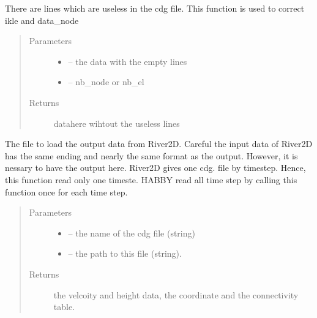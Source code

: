 \documentclass[letterpaper,10pt,english]{sphinxmanual}
\begin{document}
\begin{fulllineitems}
\label{\detokenize{index:src.river2d.get_rid_of_lines}}
There are lines which are useless in the cdg file. This function is used to correct ikle and data\_node
\begin{quote}\begin{description}
\item[{Parameters}] \leavevmode\begin{itemize}
\item {} 
 -- the data with the empty lines

\item {} 
 -- nb\_node or nb\_el

\end{itemize}

\item[{Returns}] \leavevmode
datahere wihtout the useless lines

\end{description}\end{quote}

\end{fulllineitems}


\begin{fulllineitems}
\label{\detokenize{index:src.river2d.load_river2d_cdg}}
The file to load the output data from River2D. Careful the input data of River2D has the same ending and nearly
the same format as the output. However, it is nessary to have the output here. River2D gives one cdg. file by timestep.
Hence, this function read only one timeste. HABBY read all time step by calling this function once for each time step.
\begin{quote}\begin{description}
\item[{Parameters}] \leavevmode\begin{itemize}
\item {} 
 -- the name of the cdg file (string)

\item {} 
 -- the path to this file (string).

\end{itemize}

\item[{Returns}] \leavevmode
the velcoity and height data, the coordinate and the connectivity table.

\end{description}\end{quote}

\end{fulllineitems}
\end{document}
